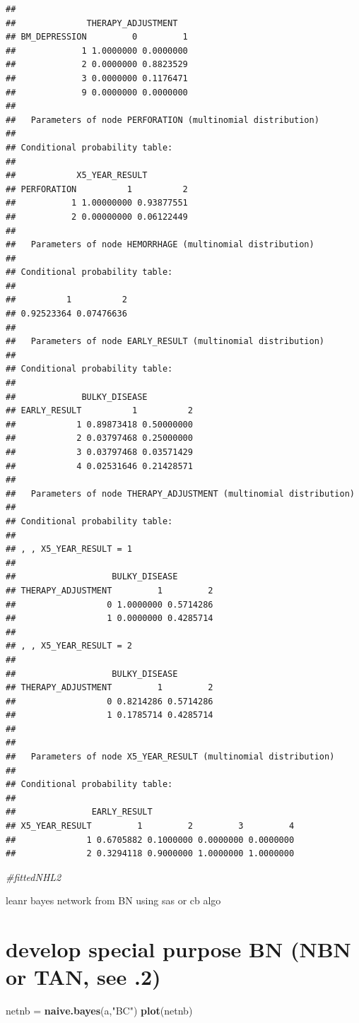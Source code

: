 \documentclass[]{article}
\newenvironment{Shaded}{\begin{snugshade}}{\end{snugshade}}
\newcommand{\KeywordTok}[1]{\textcolor[rgb]{0.13,0.29,0.53}{\textbf{{#1}}}}
\newcommand{\StringTok}[1]{\textcolor[rgb]{0.31,0.60,0.02}{{#1}}}
\newcommand{\CommentTok}[1]{\textcolor[rgb]{0.56,0.35,0.01}{\textit{{#1}}}}
\newcommand{\NormalTok}[1]{{#1}}
\begin{document}
\begin{verbatim}
##  
##              THERAPY_ADJUSTMENT
## BM_DEPRESSION         0         1
##             1 1.0000000 0.0000000
##             2 0.0000000 0.8823529
##             3 0.0000000 0.1176471
##             9 0.0000000 0.0000000
## 
##   Parameters of node PERFORATION (multinomial distribution)
## 
## Conditional probability table:
##  
##            X5_YEAR_RESULT
## PERFORATION          1          2
##           1 1.00000000 0.93877551
##           2 0.00000000 0.06122449
## 
##   Parameters of node HEMORRHAGE (multinomial distribution)
## 
## Conditional probability table:
##  
##          1          2 
## 0.92523364 0.07476636 
## 
##   Parameters of node EARLY_RESULT (multinomial distribution)
## 
## Conditional probability table:
##  
##             BULKY_DISEASE
## EARLY_RESULT          1          2
##            1 0.89873418 0.50000000
##            2 0.03797468 0.25000000
##            3 0.03797468 0.03571429
##            4 0.02531646 0.21428571
## 
##   Parameters of node THERAPY_ADJUSTMENT (multinomial distribution)
## 
## Conditional probability table:
##  
## , , X5_YEAR_RESULT = 1
## 
##                   BULKY_DISEASE
## THERAPY_ADJUSTMENT         1         2
##                  0 1.0000000 0.5714286
##                  1 0.0000000 0.4285714
## 
## , , X5_YEAR_RESULT = 2
## 
##                   BULKY_DISEASE
## THERAPY_ADJUSTMENT         1         2
##                  0 0.8214286 0.5714286
##                  1 0.1785714 0.4285714
## 
## 
##   Parameters of node X5_YEAR_RESULT (multinomial distribution)
## 
## Conditional probability table:
##  
##               EARLY_RESULT
## X5_YEAR_RESULT         1         2         3         4
##              1 0.6705882 0.1000000 0.0000000 0.0000000
##              2 0.3294118 0.9000000 1.0000000 1.0000000
\end{verbatim}

\begin{Shaded}
\begin{Highlighting}[]
\CommentTok{#fittedNHL2}
\end{Highlighting}
\end{Shaded}

leanr bayes network from BN using sas or cb algo

\section{develop special purpose BN (NBN or TAN, see
.2)}\label{develop-special-purpose-bn-nbn-or-tan-see-.2}

\begin{Shaded}
\begin{Highlighting}[]
\NormalTok{netnb =}\StringTok{ }\KeywordTok{naive.bayes}\NormalTok{(a,}\StringTok{"BC"}\NormalTok{)}
\KeywordTok{plot}\NormalTok{(netnb)}
\end{Highlighting}
\end{Shaded}
\end{document}
